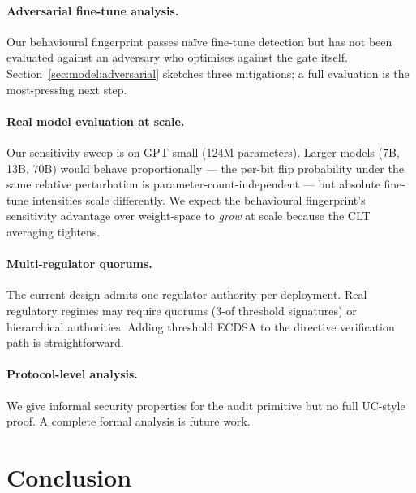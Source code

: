 \documentclass[11pt,a4paper]{article}
\begin{document}
\paragraph{Adversarial fine\nobreakdash-tune analysis.}  Our behavioural
fingerprint passes naïve fine\nobreakdash-tune detection but has not
been evaluated against an adversary who optimises against the gate
itself.  Section~\ref{sec:model:adversarial} sketches three
mitigations; a full evaluation is the most\nobreakdash-pressing next
step.

\paragraph{Real model evaluation at scale.}  Our sensitivity sweep
is on GPT small (124M parameters).  Larger models
(7B, 13B, 70B) would behave proportionally — the per\nobreakdash-bit
flip probability under the same relative perturbation is
parameter\nobreakdash-count\nobreakdash-independent — but absolute
fine\nobreakdash-tune intensities scale differently.  We expect the
behavioural fingerprint's sensitivity advantage over weight\nobreakdash-space
to \emph{grow} at scale because the CLT averaging tightens.

\paragraph{Multi\nobreakdash-regulator quorums.}  The current design
admits one regulator authority per deployment.  Real
regulatory regimes may require quorums (3\nobreakdash-of
threshold signatures) or hierarchical authorities.  Adding
threshold ECDSA \cite{nist-fips-186-5} to the directive
verification path is straightforward.

\paragraph{Protocol\nobreakdash-level analysis.}  We give informal
security properties for the audit primitive but no full UC\nobreakdash-style
proof.  A complete formal analysis is future work.

\section{Conclusion}
\label{sec:conclusion}
\end{document}
